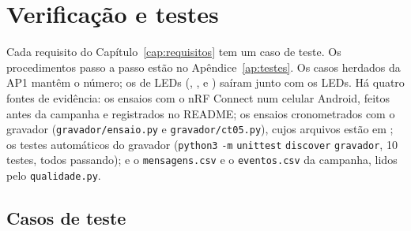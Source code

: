 \chapter{Verificação e testes}
\label{cap:testes}
\rubricaRobustez

Cada requisito do Capítulo~\ref{cap:requisitos} tem um caso de teste. Os
procedimentos passo a passo estão no Apêndice~\ref{ap:testes}. Os casos
herdados da AP1 mantêm o número; os de LEDs (, ,  e
) saíram junto com os LEDs. Há quatro fontes de evidência: os
ensaios com o nRF Connect num celular Android, feitos antes da campanha e
registrados no README; os ensaios cronometrados com o gravador
(\texttt{gravador/ensaio.py} e \texttt{gravador/ct05.py}), cujos arquivos
estão em ; os testes automáticos do gravador
(\texttt{python3} \texttt{-m} \texttt{unittest} \texttt{discover} \texttt{gravador}, 10 testes, todos
passando); e o \texttt{mensagens.csv} e o \texttt{eventos.csv} da
campanha, lidos pelo \texttt{qualidade.py}.

\section{Casos de teste}
\label{sec:testes-casos}

